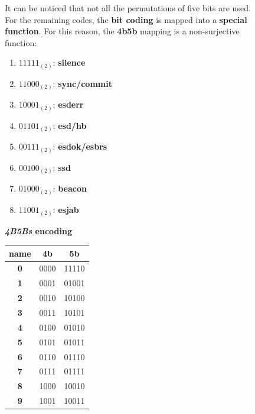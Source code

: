 \begin{figure}[h]
    \centering
    \begin{minipage}[t]{0.45\textwidth}
        It can be noticed that not all the permutations of five bits are used. For the remaining codes, the \textbf{bit coding} is mapped into a \textbf{special function}. For this reason, the \textbf{4b5b} mapping is a non-surjective function:
        \begin{enumerate}[nosep]
            \item $11111_{(2)}$: \textbf{silence}
            \item $11000_{(2)}$: \textbf{sync/commit}
            \item $10001_{(2)}$: \textbf{esderr}
            \item $01101_{(2)}$: \textbf{esd/hb}
            \item $00111_{(2)}$: \textbf{esdok/esbrs}
            \item $00100_{(2)}$: \textbf{ssd}
            \item $01000_{(2)}$: \textbf{beacon}
            \item $11001_{(2)}$: \textbf{esjab}
        \end{enumerate}
    \end{minipage}
    \hfill
    \begin{minipage}[t]{0.45\textwidth}
        \centering
        \textbf{\textit{4B5Bs} encoding}
        \begin{center}
            \begin{tabular}{| c | c | c |} \hline
                \textbf{name} & \textbf{4b} & \textbf{5b} \\ \hline
                \textbf{0} & 0000 & 11110 \\ \hline
                \textbf{1} & 0001 & 01001 \\ \hline
                \textbf{2} & 0010 & 10100 \\ \hline
                \textbf{3} & 0011 & 10101 \\ \hline
                \textbf{4} & 0100 & 01010 \\ \hline
                \textbf{5} & 0101 & 01011 \\ \hline
                \textbf{6} & 0110 & 01110 \\ \hline
                \textbf{7} & 0111 & 01111 \\ \hline
                \textbf{8} & 1000 & 10010 \\ \hline
                \textbf{9} & 1001 & 10011 \\ \hline

\end{tabular}
\end{center}
\end{minipage}
\end{figure}
